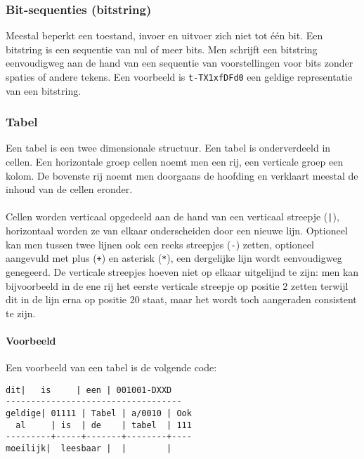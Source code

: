 \subsubsection{Bit-sequenties (bitstring)}
Meestal beperkt een toestand, invoer en uitvoer zich niet tot \'e\'en bit. Een bitstring is een sequentie van nul of meer bits. Men schrijft een bitstring eenvoudigweg aan de hand van een sequentie van voorstellingen voor bits zonder spaties of andere tekens. Een voorbeeld is \texttt{t-TX1xfDFd0} een geldige representatie van een bitstring.
\subsubsection{Tabel}
Een tabel is een twee dimensionale structuur. Een tabel is onderverdeeld in cellen. Een horizontale groep cellen noemt men een rij, een verticale groep een kolom. De bovenste rij noemt men doorgaans de hoofding en verklaart meestal de inhoud van de cellen eronder.
\paragraph{}
Cellen worden verticaal opgedeeld aan de hand van een verticaal streepje (\texttt{|}), horizontaal worden ze van elkaar onderscheiden door een nieuwe lijn. Optioneel kan men tussen twee lijnen ook een reeks streepjes (\texttt{-}) zetten, optioneel aangevuld met plus (\texttt{+}) en asterisk (\texttt{*}), een dergelijke lijn wordt eenvoudigweg genegeerd. De verticale streepjes hoeven niet op elkaar uitgelijnd te zijn: men kan bijvoorbeeld in de ene rij het eerste verticale streepje op positie $2$ zetten terwijl dit in de lijn erna op positie $20$ staat, maar het wordt toch aangeraden consistent te zijn.
\paragraph{Voorbeeld}
Een voorbeeld van een tabel is de volgende code:
\begin{verbatim}
dit|   is     | een | 001001-DXXD
-----------------------------------
geldige| 01111 | Tabel | a/0010 | Ook
  al     | is  | de    | tabel  | 111
---------+-----+-------+--------+----
moeilijk|  leesbaar |  |        |
\end{verbatim}
